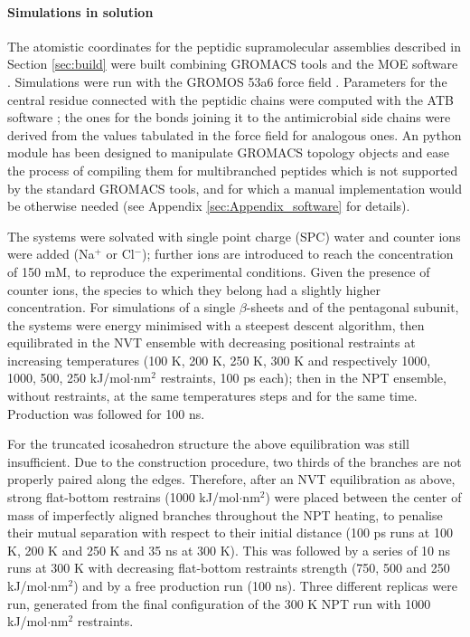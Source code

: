 \paragraph{Simulations in solution} The atomistic coordinates for the peptidic supramolecular assemblies described in Section \ref{sec:build} were built combining GROMACS tools and the MOE software \citep{moe}.
%
Simulations were run with the GROMOS 53a6 force field \citep{Oostenbrink2004}. Parameters for the central residue connected with the peptidic chains were computed with the ATB software \citep{Malde2011, Koziara2014}; the ones for the bonds joining it to the antimicrobial side chains were derived from the values tabulated in the force field for analogous ones.
%
An python module has been designed to manipulate GROMACS topology objects and ease the process of compiling them for multibranched peptides which is not supported by the standard GROMACS tools, and for which a manual implementation would be otherwise needed (see Appendix \ref{sec:Appendix_software} for details).

The systems were solvated with single point charge (SPC) water \citep{Berendsen1981} and counter ions were added (Na$^+$ or Cl$^-$); further ions are introduced to reach the concentration of 150 mM, to reproduce the experimental conditions. Given the presence of counter ions, the species to which they belong had a slightly higher concentration.
%
For simulations of a single $\beta$-sheets and of the pentagonal subunit, the systems were energy minimised with a steepest descent algorithm, then equilibrated in the NVT ensemble with decreasing positional restraints at increasing temperatures (100 K, 200 K, 250 K, 300 K and respectively 1000, 1000, 500, 250 kJ/mol$\cdot$nm$^2$ restraints, 100 ps each); then in the NPT ensemble, without restraints, at the same temperatures steps and for the same time. Production was followed for 100 ns.

For the truncated icosahedron structure the above equilibration was still insufficient. Due to the construction procedure, two thirds of the branches are not properly paired along the edges.
%
Therefore, after an NVT equilibration as above, strong flat-bottom restrains (1000 kJ/mol$\cdot$nm$^2$) were placed between the center of mass of imperfectly aligned branches throughout the NPT heating, to penalise their mutual separation with respect to their initial distance (100 ps runs at 100 K, 200 K and 250 K and 35 ns at 300 K).
%
This was followed by a series of 10 ns runs at 300 K with decreasing flat-bottom restraints strength (750, 500 and 250 kJ/mol$\cdot$nm$^2$) and by a free production run (100 ns).
%
Three different replicas were run, generated from the final configuration of the 300 K NPT run with 1000 kJ/mol$\cdot$nm$^2$ restraints.

